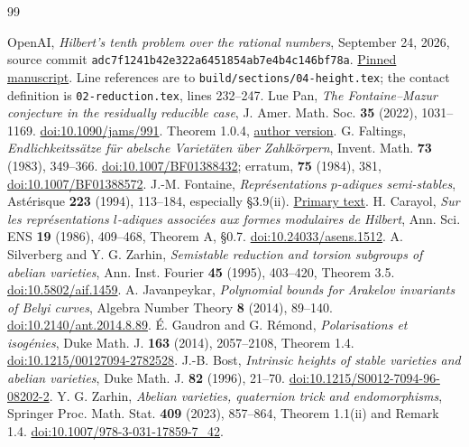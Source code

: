 \documentclass[11pt]{article}
\begin{document}
\begin{thebibliography}{99}\footnotesize\raggedright
\setlength{\itemsep}{2pt}\setlength{\parskip}{0pt}
 OpenAI, \emph{Hilbert's tenth problem over the rational numbers},
September 24, 2026, source commit
\texttt{adc7f1241b42e322a6451854ab7e4b4c146bf78a}.
\href{https://github.com/openai/math/tree/adc7f1241b42e322a6451854ab7e4b4c146bf78a/preprints/Hilberts-tenth-problem-over-the-rational-numbers-September-24-2026}{Pinned manuscript}.
Line references are to \texttt{build/sections/04-height.tex};
the contact definition is \texttt{02-reduction.tex}, lines 232--247.
 Lue Pan, \emph{The Fontaine--Mazur conjecture in the residually
reducible case}, J. Amer. Math. Soc. \textbf{35} (2022), 1031--1169.
\href{https://doi.org/10.1090/jams/991}{doi:10.1090/jams/991}.
Theorem 1.0.4, \href{https://arxiv.org/pdf/1901.07166v2}{author version}.
 G. Faltings, \emph{Endlichkeitss\"atze f\"ur abelsche
Variet\"aten \"uber Zahlk\"orpern}, Invent. Math. \textbf{73} (1983), 349--366.
\href{https://doi.org/10.1007/BF01388432}{doi:10.1007/BF01388432};
erratum, \textbf{75} (1984), 381,
\href{https://doi.org/10.1007/BF01388572}{doi:10.1007/BF01388572}.
 J.-M. Fontaine, \emph{Repr\'esentations $p$-adiques
semi-stables}, Ast\'erisque \textbf{223} (1994), 113--184, especially \S3.9(ii).
\href{https://www.numdam.org/item/AST_1994__223__113_0/}{Primary text}.
 H. Carayol, \emph{Sur les repr\'esentations $l$-adiques
associ\'ees aux formes modulaires de Hilbert}, Ann. Sci. ENS
\textbf{19} (1986), 409--468, Theorem A, \S0.7.
\href{https://doi.org/10.24033/asens.1512}{doi:10.24033/asens.1512}.
 A. Silverberg and Y. G. Zarhin,
\emph{Semistable reduction and torsion subgroups of abelian varieties},
Ann. Inst. Fourier \textbf{45} (1995), 403--420, Theorem 3.5.
\href{https://doi.org/10.5802/aif.1459}{doi:10.5802/aif.1459}.
 A. Javanpeykar, \emph{Polynomial bounds for Arakelov
invariants of Belyi curves}, Algebra Number Theory \textbf{8} (2014), 89--140.
\href{https://doi.org/10.2140/ant.2014.8.89}{doi:10.2140/ant.2014.8.89}.
 \'E. Gaudron and G. R\'emond, \emph{Polarisations et isog\'enies},
Duke Math. J. \textbf{163} (2014), 2057--2108, Theorem 1.4.
\href{https://doi.org/10.1215/00127094-2782528}{doi:10.1215/00127094-2782528}.
 J.-B. Bost, \emph{Intrinsic heights of stable varieties and
abelian varieties}, Duke Math. J. \textbf{82} (1996), 21--70.
\href{https://doi.org/10.1215/S0012-7094-96-08202-2}{doi:10.1215/S0012-7094-96-08202-2}.
 Y. G. Zarhin, \emph{Abelian varieties, quaternion trick and
endomorphisms}, Springer Proc. Math. Stat. \textbf{409} (2023), 857--864,
Theorem 1.1(ii) and Remark 1.4.
\href{https://doi.org/10.1007/978-3-031-17859-7_42}{doi:10.1007/978-3-031-17859-7\_42}.
\end{thebibliography}
\end{document}

